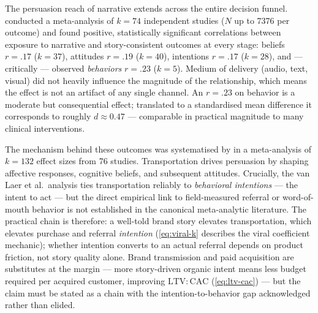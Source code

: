The persuasion reach of narrative extends across the entire decision funnel.
\textcite{braddock2016narrative} conducted a meta-analysis of \(k = 74\) independent
studies (\(N\) up to \num{7376} per outcome) and found positive, statistically significant
correlations between exposure to narrative and story-consistent outcomes at every stage:
beliefs \(r = .17\) (\(k = 37\)), attitudes \(r = .19\) (\(k = 40\)), intentions
\(r = .17\) (\(k = 28\)), and — critically — observed \emph{behaviors} \(r = .23\)
(\(k = 5\)). Medium of delivery (audio, text, visual) did not heavily influence the
magnitude of the relationship, which means the effect is not an artifact of any single
channel. An \(r = .23\) on behavior is a moderate but consequential effect; translated
to a standardised mean difference it corresponds to roughly \(d \approx 0.47\) —
comparable in practical magnitude to many clinical interventions.

The mechanism behind these outcomes was systematised by \textcite{vanlaer2014extended}
in a meta-analysis of \(k = 132\) effect sizes from 76 studies. Transportation drives
persuasion by shaping affective responses, cognitive beliefs, and subsequent attitudes.
Crucially, the van Laer et al.\ analysis ties transportation reliably to
\emph{behavioral intentions} — the intent to act — but the direct empirical link to
field-measured referral or word-of-mouth behavior is not established in the canonical
meta-analytic literature. %
The practical chain is therefore: a well-told brand story elevates transportation, which
elevates purchase and referral \emph{intention} (\cref{eq:viral-k} describes the viral
coefficient mechanic); whether intention converts to an actual referral depends on product
friction, not story quality alone. Brand transmission and paid acquisition are substitutes
at the margin — more story-driven organic intent means less budget required per acquired
customer, improving \(\mathrm{LTV:CAC}\) (\cref{eq:ltv-cac}) — but the claim must be
stated as a chain with the intention-to-behavior gap acknowledged rather than elided.

